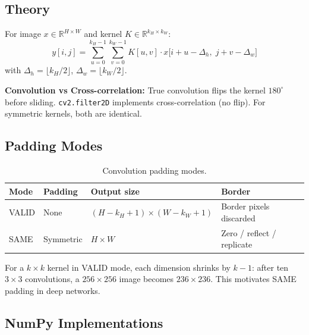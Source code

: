 \documentclass[12pt,a4paper]{article}
\begin{document}
\subsection{Theory}

For image $x \in \mathbb{R}^{H \times W}$ and kernel $K \in \mathbb{R}^{k_H \times k_W}$:
\begin{equation}
  y[i,j] = \sum_{u=0}^{k_H-1}\sum_{v=0}^{k_W-1}
            K[u,v]\cdot x\!\bigl[i + u - \Delta_h,\; j + v - \Delta_w\bigr]
  \label{eq:conv}
\end{equation}
with $\Delta_h = \lfloor k_H/2 \rfloor$, $\Delta_w = \lfloor k_W/2 \rfloor$.

\textbf{Convolution vs Cross-correlation:} True convolution flips the kernel
$180^\circ$ before sliding. \texttt{cv2.filter2D} implements cross-correlation
(no flip). For symmetric kernels, both are identical.

\subsection{Padding Modes}

\begin{table}[H]
  \centering
  \begin{tabular}{@{}llll@{}}
    \toprule
    Mode & Padding & Output size & Border \\
    \midrule
    VALID & None & $(H-k_H+1)\times(W-k_W+1)$ & Border pixels discarded \\
    SAME  & Symmetric & $H\times W$ & Zero / reflect / replicate \\
    \bottomrule
  \end{tabular}
  \caption{Convolution padding modes.}
\end{table}

For a $k\times k$ kernel in VALID mode, each dimension shrinks by $k-1$:
after ten $3\times3$ convolutions, a $256\times256$ image becomes $236\times236$.
This motivates SAME padding in deep networks.

\subsection{NumPy Implementations}
\end{document}

